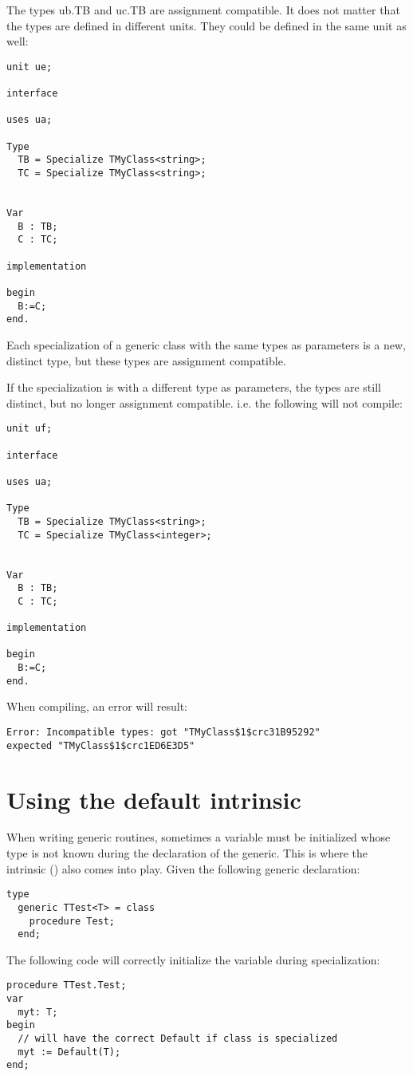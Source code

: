 The types ub.TB and  uc.TB are assignment compatible.
It does not matter that the types are defined in different units. They could
be defined in the same unit as well:
\begin{verbatim}
unit ue;

interface

uses ua;

Type
  TB = Specialize TMyClass<string>;
  TC = Specialize TMyClass<string>;


Var
  B : TB;
  C : TC;
  
implementation

begin
  B:=C;
end.
\end{verbatim}
Each specialization of a generic class with the same types as parameters is a new,
distinct type, but these types are assignment compatible.

If the specialization is with a different type as parameters, the types are
still distinct, but no longer assignment compatible. i.e. the following will
not compile:
\begin{verbatim}
unit uf;

interface

uses ua;

Type
  TB = Specialize TMyClass<string>;
  TC = Specialize TMyClass<integer>;


Var
  B : TB;
  C : TC;
  
implementation

begin
  B:=C;
end.   
\end{verbatim}
When compiling, an error will result:
\begin{verbatim}
Error: Incompatible types: got "TMyClass$1$crc31B95292" 
expected "TMyClass$1$crc1ED6E3D5"
\end{verbatim}

\section{Using the default intrinsic}
\label{se:genericdefault}
When writing generic routines, sometimes a variable must be initialized whose type is not known during the declaration of the generic.
This is where the  intrinsic () also comes into play. Given the following generic declaration:
\begin{verbatim}
type
  generic TTest<T> = class
    procedure Test;
  end;
\end{verbatim}
The following code will correctly initialize the variable  during specialization:
\begin{verbatim}
procedure TTest.Test;
var
  myt: T;
begin
  // will have the correct Default if class is specialized
  myt := Default(T); 
end;
\end{verbatim}

